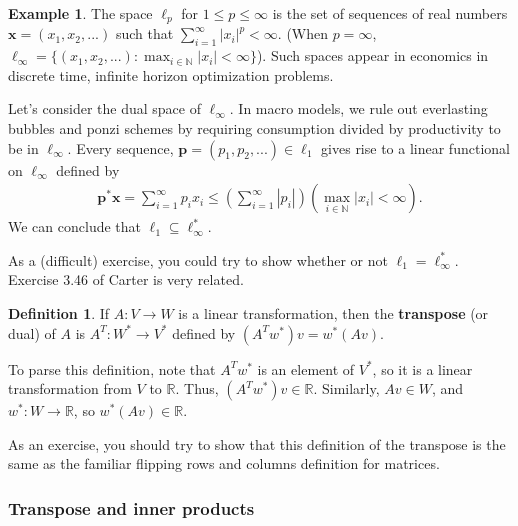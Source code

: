 \documentclass[12pt,reqno]{amsart}
\def\R{\mathbb{R}}
\theoremstyle{definition}
\newtheorem{definition}{Definition}[section]
\newtheorem{example}{Example}[section]
\begin{document}
\begin{example}
  The space $\ell_p$ for $1 \leq p \leq \infty$ is the set of
  sequences of real numbers $\mathbf{x}=(x_1, x_2, ...)$ such that
  $\sum_{i=1}^\infty |x_i|^p < \infty$. (When $p = \infty$, $\ell_\infty = \{ 
  (x_1, x_2, ...) : \max_{i \in \mathbb{N}} |x_i| < \infty \}$). Such
  spaces appear in economics in discrete time, infinite horizon
  optimization problems. 

  Let's consider the dual space of $\ell_\infty$. In macro models, we
  rule out everlasting bubbles and ponzi schemes by requiring
  consumption divided by productivity to be in $\ell_\infty$. Every
  sequence, $\mathbf{p} = (p_1, p_2, ...) \in \ell_1$ gives rise to a linear
  functional on $\ell_\infty$ defined by
  \begin{align*}
    \mathbf{p}^\ast \mathbf{x} = \sum_{i=1}^\infty p_i x_i \leq
    \left(\sum_{i=1}^\infty |p_i| \right) \left(\max_{i \in
        \mathbb{N}} |x_i| < \infty\right). 
  \end{align*}
  We can conclude that $\ell_1 \subseteq \ell_\infty^\ast$. 

  As a (difficult) exercise, you could try to show whether or not
  $\ell_1 = \ell_\infty^\ast$. Exercise 3.46 of Carter is very
  related. 
\end{example}

\begin{definition}
  If $A: V \to W$ is a linear transformation, then the
  \textbf{transpose} (or dual) of $A$ is $A^T: W^\ast \to V^\ast$
  defined by $(A^Tw^\ast)v = w^\ast(Av)$.
\end{definition}
To parse this definition, note that $A^T w^\ast$ is an element of
$V^\ast$, so it is a linear transformation from $V$ to $\R$. Thus,
$(A^T w^\ast) v \in \R$. Similarly, $Av \in W$, and $w^\ast: W \to
\R$, so $w^\ast (A v) \in \R$. 

As an exercise, you should try to show that this definition of the
transpose is the same as the familiar flipping rows and columns
definition for matrices.

\subsubsection{Transpose and inner products}
\end{document}
